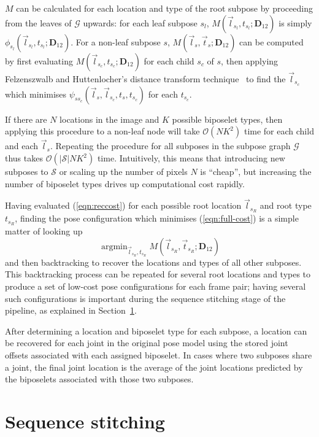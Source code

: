 \documentclass[runningheads]{llncs}
\newcommand{\mat}{\mathbf}
\DeclareMathOperator{\argmin}{arg min}
\begin{document}
$M$ can be calculated for each location and type of the root subpose by
proceeding from the leaves of $\mathcal G$ upwards: for each leaf subpose $s_l$,
$M(\vec l_{s_l}, t_{s_l}; \mat D_{12})$ is simply $\phi_{s_l}(\vec l_{s_l},
t_{s_l}; \mat D_{12})$. For a non-leaf subpose $s$, $M(\vec l_s, \vec t_s; \mat
D_{12})$ can be computed by first evaluating $M(\vec l_{s_c}, t_{s_c}; \mat
D_{12})$ for each child $s_c$ of $s$, then applying Felzenszwalb and
Huttenlocher's distance transform technique~\cite{felzenszwalb2012distance} to
find the $\vec l_{s_c}$ which minimises $\psi_{s s_c}(\vec l_s, \vec l_{s_c},
t_s, t_{s_c})$ for each $t_{s_c}$.

If there are $N$ locations in the image and $K$ possible biposelet types, then
applying this procedure to a non-leaf node will take $\mathcal O(N K^2)$ time
for each child and each $\vec l_s$. Repeating the procedure for all subposes in
the subpose graph $\mathcal G$ thus takes $\mathcal O(|\mathcal S| N K^2)$ time.
Intuitively, this means that introducing new subposes to $\mathcal S$ or scaling
up the number of pixels $N$ is ``cheap'', but increasing the number of biposelet
types drives up computational cost rapidly.

Having evaluated (\ref{eqn:reccost}) for each possible root location $\vec
l_{s_R}$ and root type $t_{s_R}$, finding the pose configuration which minimises
(\ref{eqn:full-cost}) is a simple matter of looking up
%
\begin{equation}
\argmin_{\vec l_{s_R}, t_{s_R}} M(\vec l_{s_R}, \vec t_{s_R}; \mat D_{12})
\end{equation}
%
and then backtracking to recover the locations and types of all other subposes.
This backtracking process can be repeated for several root locations and types
to produce a set of low-cost pose configurations for each frame pair; having
several such configurations is important during the sequence stitching stage of
the pipeline, as explained in Section~\ref{sec:stitching}.

After determining a location and biposelet type for each subpose, a location can
be recovered for each joint in the original pose model using the stored joint
offsets associated with each assigned biposelet. In cases where two subposes
share a joint, the final joint location is the average of the joint locations
predicted by the biposelets associated with those two subposes.

\section{Sequence stitching}\label{sec:stitching}
\end{document}

